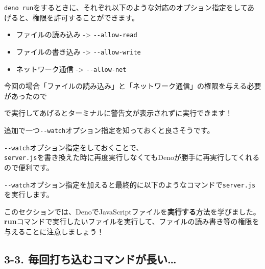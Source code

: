 \texttt{deno\ run}をするときに、それぞれ以下のような対応のオプション指定をしてあげると、権限を許可することができます。

\begin{itemize}
\item
  ファイルの読み込み -\textgreater{} \texttt{-\/-allow-read}
\item
  ファイルの書き込み -\textgreater{} \texttt{-\/-allow-write}
\item
  ネットワーク通信 -\textgreater{} \texttt{-\/-allow-net}
\end{itemize}

今回の場合「ファイルの読み込み」と「ネットワーク通信」の権限を与える必要があったので

\begin{Shaded}
\begin{Highlighting}[]
\end{Highlighting}
\end{Shaded}

で実行してあげるとターミナルに警告文が表示されずに実行できます！

追加で一つ\texttt{-\/-watch}オプション指定を知っておくと良さそうです。

\texttt{-\/-watch}オプション指定をしておくことで、\\
\texttt{server.js}を書き換えた時に再度実行しなくてもDenoが勝手に再実行してくれるので便利です。

\texttt{-\/-watch}オプション指定を加えると最終的に以下のようなコマンドで\texttt{server.js}を実行します。

\begin{Shaded}
\begin{Highlighting}[]
\end{Highlighting}
\end{Shaded}

このセクションでは、DenoでJavaScriptファイルを\textbf{実行する}方法を学びました。\\
\textbf{run}コマンドで実行したいファイルを実行して、ファイルの読み書き等の権限を与えることに注意しましょう！

\subsection{3-3.
毎回打ち込むコマンドが長い\ldots{}}\label{ux6bceux56deux6253ux3061ux8fbcux3080ux30b3ux30deux30f3ux30c9ux304cux9577ux3044}

